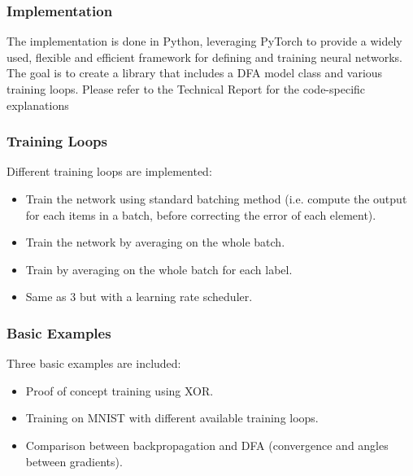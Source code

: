 \documentclass[english]{article}
\begin{document}



\subsubsection*{Implementation}
The implementation is done in Python, leveraging PyTorch to provide a widely used, flexible and efficient framework for defining and training neural networks. The goal is to create a library that includes a DFA model class and various training loops. Please refer to the Technical Report for the code-specific explanations

\subsubsection*{Training Loops}
Different training loops are implemented:
\begin{itemize}
    \item Train the network using standard batching method (i.e. compute the output for each items in a batch, before correcting the error of each element).
    \item Train the network by averaging on the whole batch.
    \item Train by averaging on the whole batch for each label.
    \item Same as 3 but with a learning rate scheduler.
\end{itemize}

\subsubsection*{Basic Examples}
Three basic examples are included:
\begin{itemize}
    \item Proof of concept training using XOR.
    \item Training on MNIST with different available training loops.
    \item Comparison between backpropagation and DFA (convergence and angles between gradients).
\end{itemize}
\end{document}
